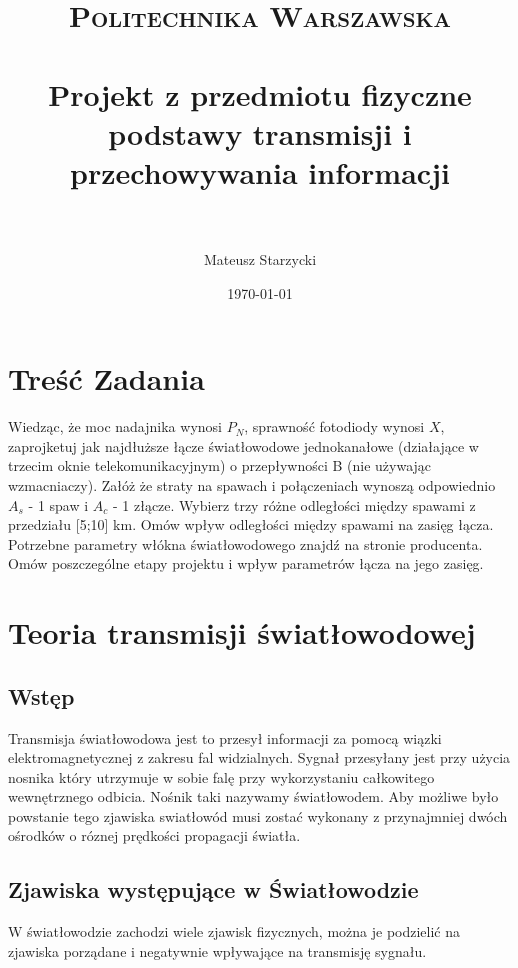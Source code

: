 \documentclass[paper=a4, fontsize=11pt]{scrartcl} %
\title{ 
    \normalfont \normalsize 
    \textsc{Politechnika Warszawska} \\ [25pt] %
    \horrule{0.5pt} \\[0.4cm] %
    \huge Projekt z przedmiotu fizyczne podstawy transmisji i przechowywania informacji \\ %
    \horrule{2pt} \\[0.5cm] %
}
\author{Mateusz Starzycki} %
\date{\normalsize\today} %
\numberwithin{equation}{section} %
\numberwithin{figure}{section} %
\numberwithin{table}{section} %
\begin{document}
\maketitle %
\newpage
\tableofcontents
\newpage

\newpage


\section{Treść Zadania}

Wiedząc, że moc nadajnika wynosi \(P_N\), sprawność fotodiody wynosi \(X\), zaprojketuj jak najdłuższe łącze światłowodowe jednokanałowe
(działające w trzecim oknie telekomunikacyjnym) o przepływności B (nie używając wzmacniaczy). Załóż że straty na spawach i połączeniach wynoszą odpowiednio
\(A_s\) - 1 spaw i \(A_c\) - 1 złącze. Wybierz trzy różne odległości między spawami z przedziału [5;10] km. Omów wpływ odległości między spawami na zasięg łącza.
Potrzebne parametry włókna światłowodowego znajdź na stronie producenta. Omów poszczególne etapy projektu i wpływ parametrów łącza na jego zasięg.

\section{Teoria transmisji światłowodowej}

\subsection{Wstęp}

Transmisja światłowodowa jest to przesył informacji za pomocą wiązki elektromagnetycznej z zakresu fal widzialnych.
Sygnał przesyłany jest przy użycia nosnika który utrzymuje w sobie falę przy wykorzystaniu całkowitego wewnętrznego odbicia.
Nośnik taki nazywamy światłowodem.
Aby możliwe było powstanie tego zjawiska swiatłowód musi zostać wykonany z przynajmniej dwóch ośrodków o róznej prędkości propagacji światła.

\subsection{Zjawiska występujące w Światłowodzie}

W światłowodzie zachodzi wiele zjawisk fizycznych, można je podzielić na zjawiska porządane i negatywnie wpływające na transmisję sygnału.
\end{document}
